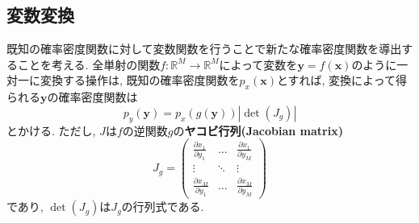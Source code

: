 \documentclass[twocolumn]{jarticle}
\begin{document}
\subsection{変数変換}
既知の確率密度関数に対して変数関数を行うことで新たな確率密度関数を導出することを考える. 全単射の関数${f : \mathbb{R}^M \to \mathbb{R}^M}$によって変数を${\bm {y} = f(\bm {x})}$のように一対一に変換する操作は, 既知の確率密度関数を${p_{x}(\bm {x})}$とすれば, 変換によって得られる${\bm {y}}$の確率密度関数は
\begin{equation}
  p_y(\bm {y}) = p_x(g(\bm {y})) \left\lvert \det (J_g)\right\rvert
\end{equation}
とかける. ただし, ${J}$は${f}$の逆関数${g}$の{\bf ヤコビ行列(Jacobian matrix)}
\begin{equation}
  J_g = \left(
    \begin{array}{ccc}
      \frac{\partial x_1}{\partial y_1} & \ldots & \frac{\partial x_1}{\partial y_M} \\
      \vdots & \ddots & \vdots \\
      \frac{\partial x_M}{\partial y_1} & \ldots & \frac{\partial x_M}{\partial y_M}
    \end{array}
  \right)
\end{equation}
であり, ${\det (J_g)}$は${J_g}$の行列式である.
\end{document}
